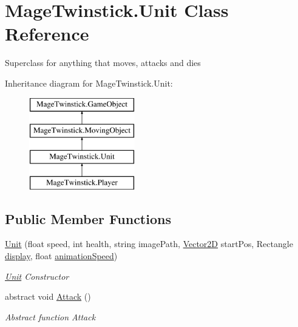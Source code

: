 \hypertarget{class_mage_twinstick_1_1_unit}{}\section{Mage\+Twinstick.\+Unit Class Reference}
\label{class_mage_twinstick_1_1_unit}


Superclass for anything that moves, attacks and dies  


Inheritance diagram for Mage\+Twinstick.\+Unit\+:\begin{figure}[H]
\begin{center}
\leavevmode
\includegraphics[height=4.000000cm]{class_mage_twinstick_1_1_unit}
\end{center}
\end{figure}
\subsection*{Public Member Functions}
\begin{DoxyCompactItemize}
\item 
\hyperlink{class_mage_twinstick_1_1_unit_a857d0f6e0f55b4c81e2a3bbf8711dd18}{Unit} (float speed, int health, string image\+Path, \hyperlink{class_mage_twinstick_1_1_vector2_d}{Vector2\+D} start\+Pos, Rectangle \hyperlink{class_mage_twinstick_1_1_game_object_a5807df7f837dc87c8955a008d0b27b50}{display}, float \hyperlink{class_mage_twinstick_1_1_game_object_a5d21c31402c27c5a19f2a62d98720456}{animation\+Speed})
\begin{DoxyCompactList}\small\item\em \hyperlink{class_mage_twinstick_1_1_unit}{Unit} Constructor \end{DoxyCompactList}\item 
abstract void \hyperlink{class_mage_twinstick_1_1_unit_a98b69920e6c6c09c5cfaacbf42a31bbf}{Attack} ()
\begin{DoxyCompactList}\small\item\em Abstract function Attack \end{DoxyCompactList}\end{DoxyCompactItemize}
